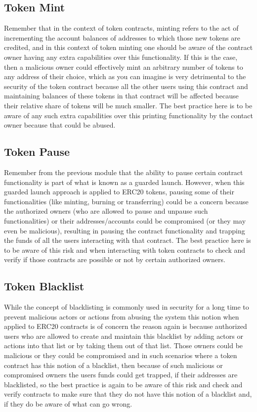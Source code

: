 \subsection{Token Mint}\label{token-mint}

Remember that in the context of token contracts, minting refers to the
act of incrementing the account balances of addresses to which those new
tokens are credited, and in this context of token minting one should be
aware of the contract owner having any extra capabilities over this
functionality. If this is the case, then a malicious owner could
effectively mint an arbitrary number of tokens to any address of their
choice, which as you can imagine is very detrimental to the security of
the token contract because all the other users using this contract and
maintaining balances of these tokens in that contract will be affected
because their relative share of tokens will be much smaller. The best
practice here is to be aware of any such extra capabilities over this
printing functionality by the contact owner because that could be
abused.

\subsection{Token Pause}\label{token-pause}

Remember from the previous module that the ability to pause certain
contract functionality is part of what is known as a guarded launch.
However, when this guarded launch approach is applied to ERC20 tokens,
pausing some of their functionalities (like minting, burning or
transferring) could be a concern because the authorized owners (who are
allowed to pause and unpause such functionalities) or their
addresses/accounts could be compromised (or they may even be malicious),
resulting in pausing the contract functionality and trapping the funds
of all the users interacting with that contract. The best practice here
is to be aware of this risk and when interacting with token contracts to
check and verify if those contracts are possible or not by certain
authorized owners.

\subsection{Token Blacklist}\label{token-blacklist}

While the concept of blacklisting is commonly used in security for a
long time to prevent malicious actors or actions from abusing the system
this notion when applied to ERC20 contracts is of concern the reason
again is because authorized users who are allowed to create and maintain
this blacklist by adding actors or actions into that list or by taking
them out of that list. Those owners could be malicious or they could be
compromised and in such scenarios where a token contract has this notion
of a blacklist, then because of such malicious or compromised owners the
users funds could get trapped, if their addresses are blacklisted, so
the best practice is again to be aware of this risk and check and verify
contracts to make sure that they do not have this notion of a blacklist
and, if they do be aware of what can go wrong.

